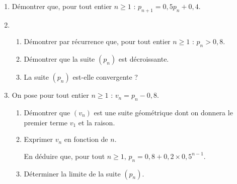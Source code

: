 \documentclass{cornouaille}
\begin{document}
\begin{exercice}
\begin{enumerate}[resume,start=2]
\item Démontrer que, pour tout entier $n \geqslant 1$ : $p_{n+1} = 0,5p_n + 0,4$.
\item 
	\begin{enumerate}
		\item Démontrer par récurrence que, pour tout entier $n \geqslant 1$ : $p_n > 0,8$.
		\item Démontrer que la suite $\left(p_n\right)$ est décroissante.
		\item La suite $\left(p_n\right)$ est-elle convergente ?
 	\end{enumerate}
\item On pose pour tout entier $n \geqslant 1$ : $v_n = p_n - 0,8$.
	\begin{enumerate}
		\item Démontrer que $\left(v_n\right)$ est une suite géométrique dont on donnera le premier terme $v_1$ et la raison.
		\item  Exprimer $v_n$ en fonction de $n$.
		
En déduire que, pour tout $n \geqslant 1$,\: $p_n = 0,8 + 0,2 \times  0,5^{n-1}$.
		\item  Déterminer la limite de la suite $\left(p_n\right)$.
	\end{enumerate}
\end{enumerate}
\end{exercice}
\end{document}

